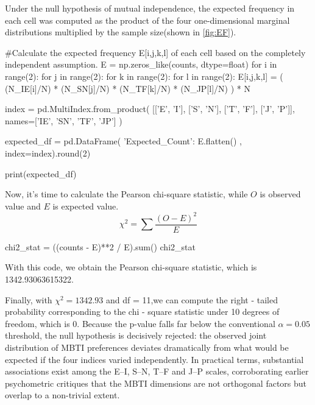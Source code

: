 \documentclass[12pt]{article}
\numberwithin{figure}{section}  %
\begin{document}
	Under the null hypothesis of mutual independence, the expected frequency in
	each cell was computed as the product of the four one-dimensional marginal
	distributions multiplied by the sample size(shown in \cref{fig:EF}).
	\begin{python}
#Calculate the expected frequency E[i,j,k,l] of each cell based on the completely independent assumption.
E = np.zeros_like(counts, dtype=float)
for i in range(2):
    for j in range(2):
        for k in range(2):
            for l in range(2):
                E[i,j,k,l] = (
                    (N_IE[i]/N) *
                    (N_SN[j]/N) *
                    (N_TF[k]/N) *
                    (N_JP[l]/N)
                ) * N

index = pd.MultiIndex.from_product(
    [['E', 'I'], ['S', 'N'], ['T', 'F'], ['J', 'P']],
    names=['IE', 'SN', 'TF', 'JP']
)

expected_df = pd.DataFrame({
    'Expected_Count': E.flatten()
}, index=index).round(2)

print(expected_df)	
	\end{python}

	Now, it’s time to calculate the Pearson chi-square statistic, while $O$ is
	observed value and $E$ is expected value.
	\[
	\chi^2 = \sum \frac{(O - E)^2}{E}
	\]
	\begin{python}
chi2_stat = ((counts - E)**2 / E).sum()
chi2_stat		
	\end{python}
	With this code, we obtain the Pearson chi-square statistic, which is 1342.93063615322.
	
	Finally, with $\chi^2 = 1342.93$ and df = 11,we can compute the right - tailed %
	probability corresponding to the chi - square statistic under 10 degrees of
	freedom, which is 0. Because the p-value falls far
	below the conventional $\alpha =0.05$ threshold, the null hypothesis is decisively
	rejected: the observed joint distribution of MBTI preferences deviates
	dramatically from what would be expected if the four indices varied
	independently. In practical terms, substantial associations exist among the
	E–I, S–N, T–F and J–P scales, corroborating earlier psychometric critiques
	that the MBTI dimensions are not orthogonal factors but overlap to a
	non-trivial extent. 
	
\end{document}
